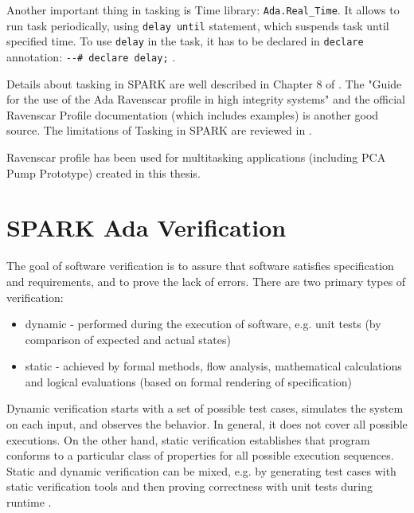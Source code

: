 Another important thing in tasking is Time library: \lstinline{Ada.Real_Time}. It allows to run task periodically, using \lstinline{delay until} statement, which suspends task until specified time. To use \lstinline{delay} in the task, it has to be declared in \lstinline{declare} annotation: \lstinline{--# declare delay;} \cite{Barnes:Book}.

Details about tasking in SPARK are well described in Chapter 8 of \cite{Barnes:Book}. The "Guide for the use of the Ada Ravenscar profile in high integrity systems" \cite{Ravenscar:Article} and the official Ravenscar Profile documentation (which includes examples) \cite{Ravenscar:Online} is another good source. The limitations of Tasking in SPARK are reviewed in \cite{IssuesWithRavenscar:Paper}.

Ravenscar profile has been used for multitasking applications (including PCA Pump Prototype) created in this thesis.



\section{SPARK Ada Verification}
\label{background:sparkverification}


The goal of software verification is to assure that software satisfies specification and requirements, and to prove the lack of errors. There are two primary types of verification:
\begin{itemize}
	\item dynamic - performed during the execution of software, e.g. unit tests (by comparison of expected and actual states)
	\item static - achieved by formal methods, flow analysis, mathematical calculations and logical evaluations (based on formal rendering of specification)
\end{itemize}

Dynamic verification starts with a set of possible test cases, simulates the system on each input, and observes the behavior. In general, it does not cover all possible executions. On the other hand, static verification establishes that program conforms to a particular class of properties for all possible execution sequences. Static and dynamic verification can be mixed, e.g. by generating test cases with static verification tools and then proving correctness with unit tests during runtime \cite{KUnit:Paper}.

